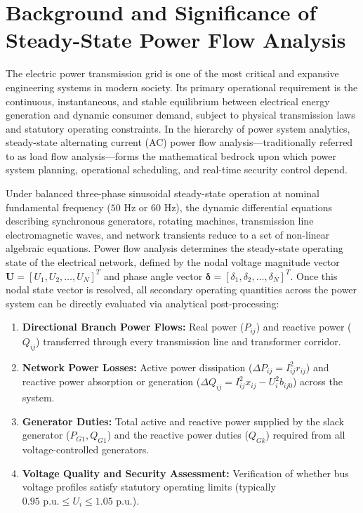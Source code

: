 \documentclass[12pt,a4paper,oneside]{report}
\begin{document}
\section{Background and Significance of Steady-State Power Flow Analysis}
The electric power transmission grid is one of the most critical and expansive engineering systems in modern society. Its primary operational requirement is the continuous, instantaneous, and stable equilibrium between electrical energy generation and dynamic consumer demand, subject to physical transmission laws and statutory operating constraints. In the hierarchy of power system analytics, steady-state alternating current (AC) power flow analysis---traditionally referred to as load flow analysis---forms the mathematical bedrock upon which power system planning, operational scheduling, and real-time security control depend.

Under balanced three-phase sinusoidal steady-state operation at nominal fundamental frequency ($50\text{ Hz}$ or $60\text{ Hz}$), the dynamic differential equations describing synchronous generators, rotating machines, transmission line electromagnetic waves, and network transients reduce to a set of non-linear algebraic equations. Power flow analysis determines the steady-state operating state of the electrical network, defined by the nodal voltage magnitude vector $\mathbf{U} = [U_1, U_2, \dots, U_N]^T$ and phase angle vector $\boldsymbol{\delta} = [\delta_1, \delta_2, \dots, \delta_N]^T$. Once this nodal state vector is resolved, all secondary operating quantities across the power system can be directly evaluated via analytical post-processing:
\begin{enumerate}
    \item \textbf{Directional Branch Power Flows:} Real power ($P_{ij}$) and reactive power ($Q_{ij}$) transferred through every transmission line and transformer corridor.
    \item \textbf{Network Power Losses:} Active power dissipation ($\Delta P_{ij} = I_{ij}^2 r_{ij}$) and reactive power absorption or generation ($\Delta Q_{ij} = I_{ij}^2 x_{ij} - U_i^2 b_{ij0}$) across the system.
    \item \textbf{Generator Duties:} Total active and reactive power supplied by the slack generator ($P_{G1}, Q_{G1}$) and the reactive power duties ($Q_{Gk}$) required from all voltage-controlled generators.
    \item \textbf{Voltage Quality and Security Assessment:} Verification of whether bus voltage profiles satisfy statutory operating limits (typically $0.95\text{ p.u.} \le U_i \le 1.05\text{ p.u.}$).
\end{enumerate}
\end{document}
